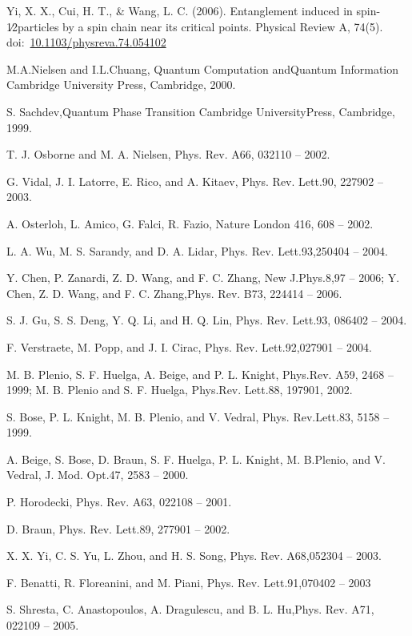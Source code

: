 \documentclass[11pt]{article}
\begin{document}
\begin{thebibliography}{3}
Yi, X. X., Cui, H. T., \& Wang, L. C. (2006). Entanglement induced in spin-1∕2particles by a spin chain near its critical points. Physical Review A, 74(5). doi:~\url{10.1103/physreva.74.054102} 

M.A.Nielsen and I.L.Chuang, Quantum Computation andQuantum Information Cambridge University Press, Cambridge, 2000.

S. Sachdev,Quantum Phase Transition Cambridge UniversityPress, Cambridge, 1999.

T. J. Osborne and M. A. Nielsen, Phys. Rev. A66, 032110 -- 2002.

G. Vidal, J. I. Latorre, E. Rico, and A. Kitaev, Phys. Rev. Lett.90, 227902 -- 2003.

A. Osterloh, L. Amico, G. Falci, R. Fazio, Nature London 416, 608 -- 2002.

L. A. Wu, M. S. Sarandy, and D. A. Lidar, Phys. Rev. Lett.93,250404 -- 2004.

Y. Chen, P. Zanardi, Z. D. Wang, and F. C. Zhang, New J.Phys.8,97 -- 2006; Y. Chen, Z. D. Wang, and F. C. Zhang,Phys. Rev. B73, 224414 -- 2006.

S. J. Gu, S. S. Deng, Y. Q. Li, and H. Q. Lin, Phys. Rev. Lett.93, 086402 -- 2004.

F. Verstraete, M. Popp, and J. I. Cirac, Phys. Rev. Lett.92,027901 -- 2004.

M. B. Plenio, S. F. Huelga, A. Beige, and P. L. Knight, Phys.Rev. A59, 2468 -- 1999; M. B. Plenio and S. F. Huelga, Phys.Rev. Lett.88, 197901, 2002.

S. Bose, P. L. Knight, M. B. Plenio, and V. Vedral, Phys. Rev.Lett.83, 5158 -- 1999.

A. Beige, S. Bose, D. Braun, S. F. Huelga, P. L. Knight, M. B.Plenio, and V. Vedral, J. Mod. Opt.47, 2583 -- 2000.

P. Horodecki, Phys. Rev. A63, 022108 -- 2001.

D. Braun, Phys. Rev. Lett.89, 277901 -- 2002.

X. X. Yi, C. S. Yu, L. Zhou, and H. S. Song, Phys. Rev. A68,052304 -- 2003.

F. Benatti, R. Floreanini, and M. Piani, Phys. Rev. Lett.91,070402 -- 2003

S. Shresta, C. Anastopoulos, A. Dragulescu, and B. L. Hu,Phys. Rev. A71, 022109 -- 2005.


\end{thebibliography}
\end{document}
